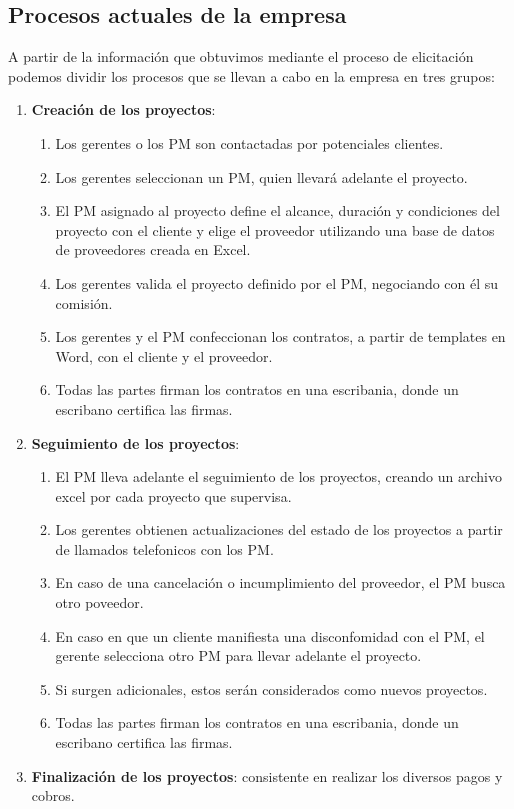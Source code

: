 \subsection{Procesos actuales de la empresa}

A partir de la información que obtuvimos mediante el proceso de elicitación podemos dividir los procesos que se llevan a cabo en la empresa en tres grupos:
\begin{enumerate}
    \item \textbf{Creación de los proyectos}:
    \begin{enumerate}
        \item Los gerentes o los PM son contactadas por potenciales clientes.
        \item Los gerentes seleccionan un PM, quien llevará adelante el proyecto.
        \item El PM asignado al proyecto define el alcance, duración y condiciones del proyecto con el cliente y elige el proveedor utilizando una base de datos de proveedores creada en Excel.
        \item Los gerentes valida el proyecto definido por el PM, negociando con él su comisión.
        \item Los gerentes y el PM confeccionan los contratos, a partir de templates en Word, con el cliente y el proveedor.
        \item Todas las partes firman los contratos en una escribania, donde un escribano certifica las firmas.
    \end{enumerate}    
    \item \textbf{Seguimiento de los proyectos}:
    \begin{enumerate}
        \item El PM lleva adelante el seguimiento de los proyectos, creando un archivo excel por cada proyecto que supervisa.   
        \item Los gerentes obtienen actualizaciones del estado de los proyectos a partir de llamados telefonicos con los PM.
        \item En caso de una cancelación o incumplimiento del proveedor, el PM busca otro poveedor.
        \item En caso en que un cliente manifiesta una disconfomidad con el PM, el gerente selecciona otro PM para llevar adelante el proyecto.
        \item Si surgen adicionales, estos serán considerados como nuevos proyectos.
        \item Todas las partes firman los contratos en una escribania, donde un escribano certifica las firmas.
    \end{enumerate}
    \item \textbf{Finalización de los proyectos}: consistente en realizar los diversos pagos y cobros.    
\end{enumerate}

